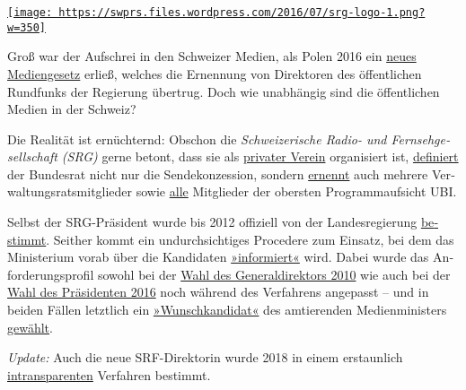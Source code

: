 \href{https://swprs.org/2017/03/01/srg-idee-suisse/}{\texttt{[image: https://swprs.files.wordpress.com/2016/07/srg-logo-1.png?w=350]}}

Groß war der Auf­schrei in den Schweizer Medien, als Polen 2016 ein
\href{http://www.nzz.ch/international/europa/wie-medien-zu-nationalen-kulturinstituten-werden-1.18670792}{neues
Medien­ge­setz} erließ, welches die Er­nennung von Di­rek­toren des
öffent­lichen Rundfunks der Regierung übertrug. Doch wie un­ab­hängig
sind die öffentlichen Medien in der Schweiz?

Die Realität ist er­nüch­ternd: Obschon die \emph{Schwei­ze­rische
Radio- und Fern­seh­ge­sell­schaft (SRG)} gerne betont, dass sie als
\href{https://web.archive.org/web/20190412225655/https://www.srginsider.ch/service-public/2013/10/30/warum-ist-der-ausdruck-staatsfernsehen-oder-oeffentlich-rechtlicher-sender-falsch/}{privater
Verein} orga­ni­siert ist,
\href{https://www.srgd.ch/de/aktuelles/news/2016/11/04/srg-konzession-weiterhin-den-handen-des-bundesrats/}{definiert}
der Bundesrat nicht nur die Sendekonzession, sondern
\href{http://www.srgssr.ch/de/srg/organe/verwaltungsrat/}{ernennt} auch
meh­rere Ver­wal­tungs­rats­mit­glieder sowie
\href{https://www.ubi.admin.ch/}{alle} Mit­glieder der obersten
Pro­gramm­auf­sicht UBI.

Selbst der SRG-Präsi­dent wurde bis 2012 offiziell von der
Landesregierung
\href{https://web.archive.org/web/20150919041519/http://www.srgssr.ch/fileadmin/pdfs/Vereinsgeschichte_SRG.pdf}{be­stimmt}.
Seit­her kommt ein un­durch­sich­tiges Pro­ce­dere zum Ein­satz, bei dem
das Minis­terium vorab über die Kan­di­daten
\href{http://www.tagesanzeiger.ch/schweiz/standard/Neuer-SRGPraesident-verzweifelt-gesucht/story/18371394}{»infor­miert«}
wird. Dabei wurde das An­for­de­rungs­profil sowohl bei der
\href{http://www.aargauerzeitung.ch/schweiz/srg-extrawurst-fuer-roger-de-weck-8808607}{Wahl
des General­di­rektors 2010} wie auch bei der
\href{http://www.nzz.ch/nzzas/nzz-am-sonntag/favorit-fuer-das-srg-praesidium-leuthard-will-cvp-freund-an-srg-spitze-ld.90097}{Wahl
des Prä­si­denten 2016} noch während des Ver­fahrens ange­passt -- und
in beiden Fällen letzt­lich ein
\href{http://www.aargauerzeitung.ch/schweiz/war-roger-de-weck-der-lieblingskandidat-von-moritz-leuenberger-8833796}{»Wunsch­kan­di­dat«}
des am­tie­renden Medien­mi­nis­ters
\href{http://www.nzz.ch/nzzas/nzz-am-sonntag/favorit-fuer-das-srg-praesidium-leuthard-will-cvp-freund-an-srg-spitze-ld.90097}{gewählt}.

\emph{Update:} Auch die neue SRF-Direktorin wurde 2018 in einem
erstaunlich
\href{http://www.kleinreport.ch/news/geheimloge-srg-intransparenz-bei-der-besetzung-der-srf-direktion-91015/}{intransparenten}
Ver­fah­ren bestimmt.

